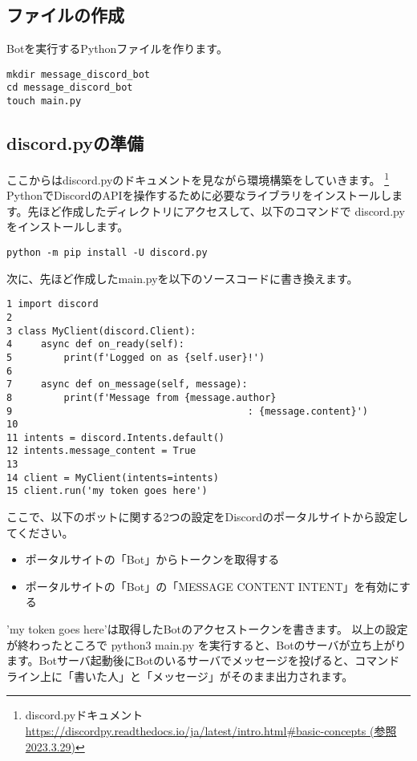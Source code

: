 \subsection{ファイルの作成}
Botを実行するPythonファイルを作ります。
\begin{shaded}
  \begin{verbatim}
mkdir message_discord_bot
cd message_discord_bot
touch main.py
\end{verbatim}
\end{shaded}

\subsection{discord.pyの準備}
ここからはdiscord.pyのドキュメントを見ながら環境構築をしていきます。
\footnote{discord.pyドキュメント\url{https://discordpy.readthedocs.io/ja/latest/intro.html\#basic-concepts (参照2023.3.29)}}
PythonでDiscordのAPIを操作するために必要なライブラリをインストールします。先ほど作成したディレクトリにアクセスして、以下のコマンドで discord.py をインストールします。
\begin{shaded}
  \begin{verbatim}
python -m pip install -U discord.py
\end{verbatim}
\end{shaded}
次に、先ほど作成したmain.pyを以下のソースコードに書き換えます。
\begin{tcolorbox}[breakable]
  \begin{verbatim}
1 import discord
2 
3 class MyClient(discord.Client):
4     async def on_ready(self):
5         print(f'Logged on as {self.user}!')
6 
7     async def on_message(self, message):
8         print(f'Message from {message.author}
9                                         : {message.content}')
10
11 intents = discord.Intents.default()
12 intents.message_content = True
13
14 client = MyClient(intents=intents)
15 client.run('my token goes here')
\end{verbatim}
\end{tcolorbox}
ここで、以下のボットに関する2つの設定をDiscordのポータルサイトから設定してください。
\begin{itemize}
  \item ポータルサイトの「Bot」からトークンを取得する
  \item ポータルサイトの「Bot」の「MESSAGE CONTENT INTENT」を有効にする
\end{itemize}
'my token goes here'は取得したBotのアクセストークンを書きます。
以上の設定が終わったところで python3 main.py を実行すると、Botのサーバが立ち上がります。Botサーバ起動後にBotのいるサーバでメッセージを投げると、コマンドライン上に「書いた人」と「メッセージ」がそのまま出力されます。

